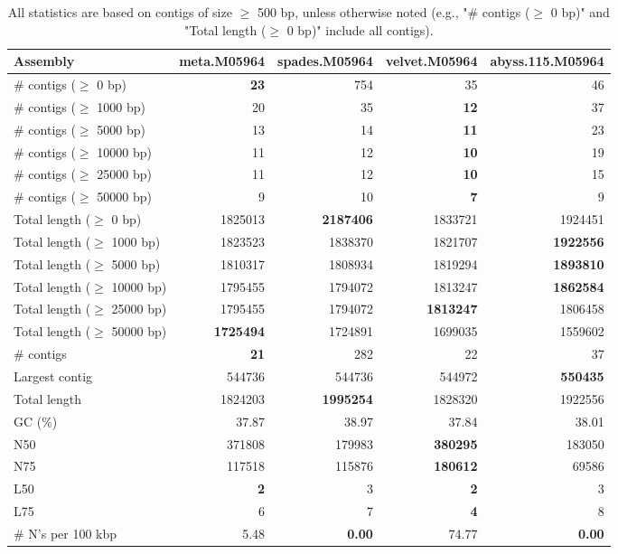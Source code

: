 \documentclass[12pt,a4paper]{article}
\begin{document}
\begin{table}[ht]
\begin{center}
\caption{All statistics are based on contigs of size $\geq$ 500 bp, unless otherwise noted (e.g., "\# contigs ($\geq$ 0 bp)" and "Total length ($\geq$ 0 bp)" include all contigs).}
\begin{tabular}{|l*{4}{|r}|}
\hline
Assembly & meta.M05964 & spades.M05964 & velvet.M05964 & abyss.115.M05964 \\ \hline
\# contigs ($\geq$ 0 bp) & {\bf 23} & 754 & 35 & 46 \\ \hline
\# contigs ($\geq$ 1000 bp) & 20 & 35 & {\bf 12} & 37 \\ \hline
\# contigs ($\geq$ 5000 bp) & 13 & 14 & {\bf 11} & 23 \\ \hline
\# contigs ($\geq$ 10000 bp) & 11 & 12 & {\bf 10} & 19 \\ \hline
\# contigs ($\geq$ 25000 bp) & 11 & 12 & {\bf 10} & 15 \\ \hline
\# contigs ($\geq$ 50000 bp) & 9 & 10 & {\bf 7} & 9 \\ \hline
Total length ($\geq$ 0 bp) & 1825013 & {\bf 2187406} & 1833721 & 1924451 \\ \hline
Total length ($\geq$ 1000 bp) & 1823523 & 1838370 & 1821707 & {\bf 1922556} \\ \hline
Total length ($\geq$ 5000 bp) & 1810317 & 1808934 & 1819294 & {\bf 1893810} \\ \hline
Total length ($\geq$ 10000 bp) & 1795455 & 1794072 & 1813247 & {\bf 1862584} \\ \hline
Total length ($\geq$ 25000 bp) & 1795455 & 1794072 & {\bf 1813247} & 1806458 \\ \hline
Total length ($\geq$ 50000 bp) & {\bf 1725494} & 1724891 & 1699035 & 1559602 \\ \hline
\# contigs & {\bf 21} & 282 & 22 & 37 \\ \hline
Largest contig & 544736 & 544736 & 544972 & {\bf 550435} \\ \hline
Total length & 1824203 & {\bf 1995254} & 1828320 & 1922556 \\ \hline
GC (\%) & 37.87 & 38.97 & 37.84 & 38.01 \\ \hline
N50 & 371808 & 179983 & {\bf 380295} & 183050 \\ \hline
N75 & 117518 & 115876 & {\bf 180612} & 69586 \\ \hline
L50 & {\bf 2} & 3 & {\bf 2} & 3 \\ \hline
L75 & 6 & 7 & {\bf 4} & 8 \\ \hline
\# N's per 100 kbp & 5.48 & {\bf 0.00} & 74.77 & {\bf 0.00} \\ \hline
\end{tabular}
\end{center}
\end{table}
\end{document}
